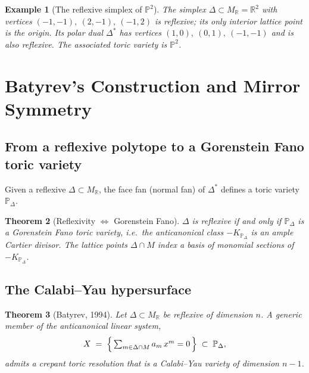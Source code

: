 \documentclass{amsart}
\newtheorem{theorem}{Theorem}[section]
\newtheorem{example}[theorem]{Example}
\begin{document}
\begin{example}[The reflexive simplex of $\mathbb{P}^2$]\label{ex:p2}
The simplex $\Delta \subset M_{\mathbb{R}} = \mathbb{R}^2$ with vertices
$(-1,-1),\ (2,-1),\ (-1,2)$ is reflexive; its only interior lattice point
is the origin. Its polar dual $\Delta^*$ has vertices
$(1,0),\ (0,1),\ (-1,-1)$ and is also reflexive. The associated toric
variety is $\mathbb{P}^2$.
\end{example}

\section{Batyrev's Construction and Mirror Symmetry}\label{sec:mirror}

\subsection{From a reflexive polytope to a Gorenstein Fano toric variety}

Given a reflexive $\Delta \subset M_{\mathbb{R}}$, the face fan
(normal fan) of $\Delta^*$ defines a toric variety $\mathbb{P}_\Delta$.

\begin{theorem}[Reflexivity $\Leftrightarrow$ Gorenstein Fano]\label{thm:fano}
$\Delta$ is reflexive if and only if $\mathbb{P}_\Delta$ is a Gorenstein
Fano toric variety, i.e.\ the anticanonical class $-K_{\mathbb{P}_\Delta}$
is an ample Cartier divisor. The lattice points $\Delta \cap M$ index a
basis of monomial sections of $-K_{\mathbb{P}_\Delta}$.
\end{theorem}

\subsection{The Calabi--Yau hypersurface}

\begin{theorem}[Batyrev, 1994]\label{thm:batyrev}
Let $\Delta \subset M_{\mathbb{R}}$ be reflexive of dimension $n$. A generic
member of the anticanonical linear system,
\begin{equation}
  X \;=\; \Bigl\{\, \textstyle\sum_{m \in \Delta \cap M} a_m\, x^{m} = 0 \,\Bigr\}
  \;\subset\; \mathbb{P}_\Delta,
\end{equation}
admits a crepant toric resolution that is a Calabi--Yau variety of
dimension $n-1$.
\end{theorem}
\end{document}
